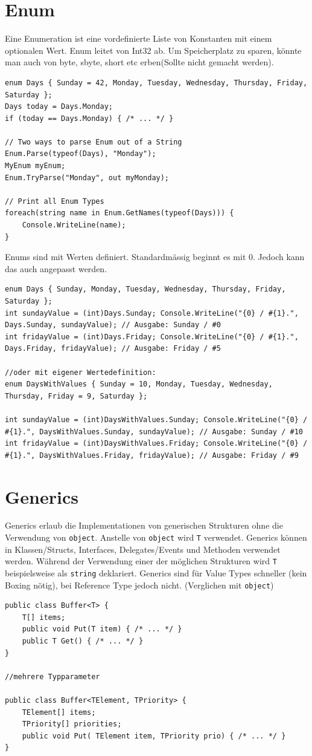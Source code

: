 \documentclass[
a4paper,
oneside,
10pt,
fleqn,
headsepline,
toc=listofnumbered, 
bibliography=totocnumbered]{scrartcl}
\let\stdsection\section
\renewcommand\section{\clearpage\stdsection}
\begin{document}
\section{Enum}
Eine Enumeration ist eine vordefinierte Liste von Konstanten mit einem optionalen Wert. Enum leitet von Int32 ab. Um Speicherplatz zu sparen, könnte man auch von byte, sbyte, short etc erben(Sollte nicht gemacht werden).  
\begin{lstlisting}
enum Days { Sunday = 42, Monday, Tuesday, Wednesday, Thursday, Friday, Saturday };
Days today = Days.Monday;
if (today == Days.Monday) { /* ... */ }

// Two ways to parse Enum out of a String
Enum.Parse(typeof(Days), "Monday");
MyEnum myEnum;
Enum.TryParse("Monday", out myMonday);

// Print all Enum Types
foreach(string name in Enum.GetNames(typeof(Days))) {
	Console.WriteLine(name);
}
\end{lstlisting}
Enums sind mit Werten definiert. Standardmässig beginnt es mit 0. Jedoch kann das auch angepasst werden.

\begin{lstlisting}
enum Days { Sunday, Monday, Tuesday, Wednesday, Thursday, Friday, Saturday };
int sundayValue = (int)Days.Sunday; Console.WriteLine("{0} / #{1}.", Days.Sunday, sundayValue); // Ausgabe: Sunday / #0
int fridayValue = (int)Days.Friday; Console.WriteLine("{0} / #{1}.", Days.Friday, fridayValue); // Ausgabe: Friday / #5 

//oder mit eigener Wertedefinition:
enum DaysWithValues { Sunday = 10, Monday, Tuesday, Wednesday, Thursday, Friday = 9, Saturday }; 

int sundayValue = (int)DaysWithValues.Sunday; Console.WriteLine("{0} / #{1}.", DaysWithValues.Sunday, sundayValue); // Ausgabe: Sunday / #10
int fridayValue = (int)DaysWithValues.Friday; Console.WriteLine("{0} / #{1}.", DaysWithValues.Friday, fridayValue); // Ausgabe: Friday / #9 
\end{lstlisting}


\section{Generics}
Generics erlaub die Implementationen von generischen Strukturen ohne die Verwendung von \lstinline|object|. Anstelle von \lstinline|object| wird \lstinline|T| verwendet.
Generics können in Klassen/Structs, Interfaces, Delegates/Events und Methoden verwendet werden. Während der Verwendung einer der möglichen Strukturen wird \lstinline|T| beispielsweise als \lstinline|string| deklariert.  Generics sind für Value Types schneller (kein Boxing nötig), bei Reference Type jedoch nicht. (Verglichen mit \lstinline|object|) 
\begin{lstlisting}
public class Buffer<T> {
	T[] items;
	public void Put(T item) { /* ... */ }
	public T Get() { /* ... */ }
}

//mehrere Typparameter

public class Buffer<TElement, TPriority> {
    TElement[] items; 
    TPriority[] priorities; 
    public void Put( TElement item, TPriority prio) { /* ... */ } 
} 
\end{lstlisting}
\end{document}
